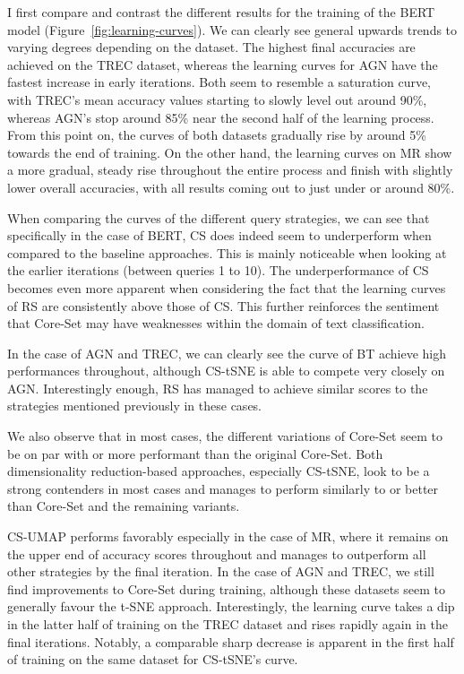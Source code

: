 \documentclass[english,bachelor,ul]{webisthesis} %
\begin{document}
I first compare and contrast the different results for the training of the BERT model (Figure~\ref{fig:learning-curves}). We can clearly see general upwards trends to varying degrees depending on the dataset. The highest final accuracies are achieved on the TREC dataset, whereas the learning curves for AGN have the fastest increase in early iterations. Both seem to resemble a saturation curve, with TREC's mean accuracy values starting to slowly level out around 90\%, whereas AGN's stop around 85\% near the second half of the learning process. From this point on, the curves of both datasets gradually rise by around 5\% towards the end of training. On the other hand, the learning curves on MR show a more gradual, steady rise throughout the entire process and finish with slightly lower overall accuracies, with all results coming out to just under or around 80\%. 

When comparing the curves of the different query strategies, we can see that specifically in the case of BERT, CS does indeed seem to underperform when compared to the baseline approaches. This is mainly noticeable when looking at the earlier iterations (between queries 1 to 10). The underperformance of CS becomes even more apparent when considering the fact that the learning curves of RS are consistently above those of CS. This further reinforces the sentiment that Core-Set may have weaknesses within the domain of text classification. 

In the case of AGN and TREC, we can clearly see the curve of BT achieve high performances throughout, although CS-tSNE is able to compete very closely on AGN. Interestingly enough, RS has managed to achieve similar scores to the strategies mentioned previously in these cases.

We also observe that in most cases, the different variations of Core-Set seem to be on par with or more performant than the original Core-Set. Both dimensionality reduction-based approaches, especially CS-tSNE, look to be a strong contenders in most cases and manages to perform similarly to or better than Core-Set and the remaining variants. 

CS-UMAP performs favorably especially in the case of MR, where it remains on the upper end of accuracy scores throughout and manages to outperform all other strategies by the final iteration. In the case of AGN and TREC, we still find improvements to Core-Set during training, although these datasets seem to generally favour the t-SNE approach. Interestingly, the learning curve takes a dip in the latter half of training on the TREC dataset and rises rapidly again in the final iterations. Notably, a comparable sharp decrease is apparent in the first half of training on the same dataset for CS-tSNE's curve.
\end{document}
